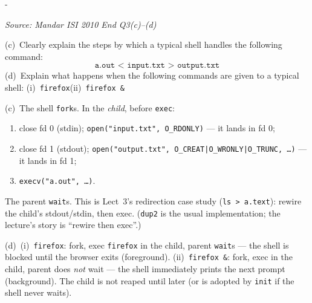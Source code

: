 \documentclass[11pt,a4paper]{article}
\makeatletter
\newcommand{\keepspace}[1]{\par\penalty-100\begingroup
  \setlength{\dimen@}{#1}\dimen@ii\pagegoal\advance\dimen@ii-\pagetotal
  \ifdim\dimen@>\dimen@ii\ifdim\dimen@ii>\z@\vfil\fi\break\fi\endgroup}
\newcounter{qn}[section]
\newenvironment{Qn}[4]{%
  \refstepcounter{qn}\keepspace{7\baselineskip}%
  \begin{tcolorbox}[qboxstyle, title={Q\thesection.\theqn\ \ [#1 \textbar\ #2]\ \ #4}]%
  {\footnotesize\color{g3}\textit{Source: #3}}\par\smallskip%
}{%
  \end{tcolorbox}%
}
\newenvironment{Sol}{%
  \begin{tcolorbox}[sboxstyle, title={Solution}]%
}{%
  \end{tcolorbox}\vspace{0.35em}%
}
\makeatother
\begin{document}
\begin{Qn}{Medium}{Lect 3}{Mandar ISI 2010 End Q3(c)--(d)}{Shell: redirection, and \texttt{firefox} vs.\ \texttt{firefox \&}}
(c)~Clearly explain the steps by which a typical shell handles the following command:
\[
\texttt{a.out < input.txt > output.txt}
\]
(d)~Explain what happens when the following commands are given to a typical shell: (i)~\texttt{firefox}\quad (ii)~\texttt{firefox \&}
\end{Qn}
\begin{Sol}
(c)~The shell \texttt{fork}s. In the \emph{child}, before \texttt{exec}:
\begin{enumerate}
  \item close fd 0 (stdin); \texttt{open("input.txt", O\_RDONLY)} --- it lands in fd 0;
  \item close fd 1 (stdout); \texttt{open("output.txt", O\_CREAT|O\_WRONLY|O\_TRUNC, \ldots)} --- it lands in fd 1;
  \item \texttt{execv("a.out", \ldots)}.
\end{enumerate}
The parent \texttt{wait}s. This is Lect~3's redirection case study (\texttt{ls > a.text}): rewire the child's stdout/stdin, then exec. (\texttt{dup2} is the usual implementation; the lecture's story is ``rewire then exec''.)

(d)~(i)~\texttt{firefox}: fork, exec \texttt{firefox} in the child, parent \texttt{wait}s --- the shell is blocked until the browser exits (foreground). (ii)~\texttt{firefox \&}: fork, exec in the child, parent does \emph{not} wait --- the shell immediately prints the next prompt (background). The child is not reaped until later (or is adopted by \texttt{init} if the shell never waits).
\end{Sol}
\end{document}
